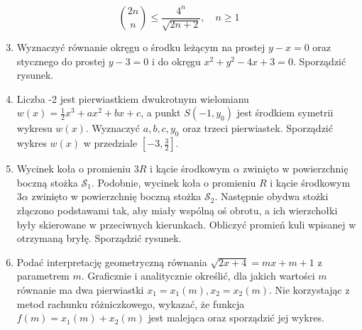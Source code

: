 \documentclass[10pt]{article}
\begin{document}
$$
\binom{2 n}{n} \leqslant \frac{4^{n}}{\sqrt{2 n+2}}, \quad n \geqslant 1
$$

\begin{enumerate}
  \setcounter{enumi}{2}
  \item Wyznaczyć równanie okręgu o środku leżącym na prostej $y-x=0$ oraz stycznego do prostej $y-3=0$ i do okręgu $x^{2}+y^{2}-4 x+3=0$. Sporządzić rysunek.
  \item Liczba -2 jest pierwiastkiem dwukrotnym wielomianu $w(x)=\frac{1}{2} x^{3}+a x^{2}+b x+c$, a punkt $S\left(-1, y_{0}\right)$ jest środkiem symetrii wykresu $w(x)$. Wyznaczyć $a, b, c, y_{0}$ oraz trzeci pierwiastek. Sporządzić wykres $w(x)$ w przedziale $\left[-3, \frac{3}{2}\right]$.
  \item Wycinek koła o promieniu $3 R$ i kącie środkowym $\alpha$ zwinięto w powierzchnię boczną stożka $\mathcal{S}_{1}$. Podobnie, wycinek koła o promieniu $R$ i kącie środkowym $3 \alpha$ zwinięto w powierzchnię boczną stożka $\mathcal{S}_{2}$. Następnie obydwa stożki złączono podstawami tak, aby miały wspólną oś obrotu, a ich wierzchołki były skierowane w przeciwnych kierunkach. Obliczyć promień kuli wpisanej w otrzymaną bryłę. Sporządzić rysunek.
  \item Podać interpretację geometryczną równania $\sqrt{2 x+4}=m x+m+1$ z parametrem $m$. Graficznie i analitycznie określić, dla jakich wartości $m$ równanie ma dwa pierwiastki $x_{1}=x_{1}(m), x_{2}=x_{2}(m)$. Nie korzystając z metod rachunku różniczkowego, wykazać, że funkcja $f(m)=x_{1}(m)+x_{2}(m)$ jest malejąca oraz sporządzić jej wykres.
\end{enumerate}
\end{document}

